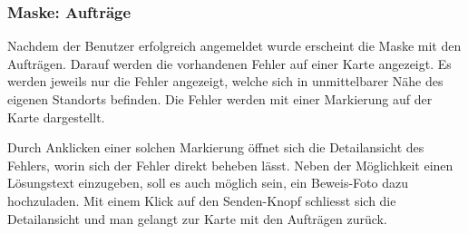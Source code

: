 \begin{figure}[H]
\hfill
{}
\end{figure}

\subsubsection{Maske: Aufträge}
Nachdem der Benutzer erfolgreich angemeldet wurde erscheint die Maske mit den Aufträgen.
Darauf werden die vorhandenen Fehler auf einer Karte angezeigt.
Es werden jeweils nur die Fehler angezeigt, welche sich in unmittelbarer Nähe des eigenen Standorts befinden.
Die Fehler werden mit einer Markierung auf der Karte dargestellt.

Durch Anklicken einer solchen Markierung öffnet sich die Detailansicht des Fehlers, worin sich der Fehler direkt beheben lässt.
Neben der Möglichkeit einen Lösungstext einzugeben, soll es auch möglich sein, ein Beweis-Foto dazu hochzuladen.
Mit einem Klick auf den Senden-Knopf schliesst sich die Detailansicht und man gelangt zur Karte mit den Aufträgen zurück.

